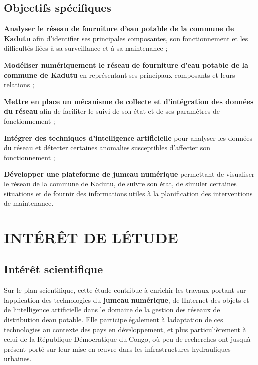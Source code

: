 \subsection{Objectifs spécifiques}
\label{objectifs-specifiques}


\noindent\textbf{Analyser le réseau de fourniture d'eau potable de la
	commune de Kadutu} afin d'identifier ses principales composantes, son
fonctionnement et les difficultés liées à sa surveillance et à sa
maintenance ;

\noindent\textbf{Modéliser numériquement le réseau de fourniture d'eau
	potable de la commune de Kadutu} en représentant ses principaux
composants et leurs relations ;

\noindent\textbf{Mettre en place un mécanisme de collecte et
	d'intégration des données du réseau} afin de faciliter le suivi de son
état et de ses paramètres de fonctionnement ;

\noindent\textbf{Intégrer des techniques d'intelligence artificielle}
pour analyser les données du réseau et détecter certaines anomalies
susceptibles d'affecter son fonctionnement ;

\noindent\textbf{Développer une plateforme de jumeau numérique}
permettant de visualiser le réseau de la commune de Kadutu, de suivre
son état, de simuler certaines situations et de fournir des
informations utiles à la planification des interventions de
maintenance.

\section{INTÉRÊT DE
L\textquotesingle ÉTUDE}\label{intuxe9ruxeat-de-luxe9tude}

\subsection{Intérêt
scientifique}\label{intuxe9ruxeat-scientifique}

Sur le plan scientifique, cette étude contribue à enrichir les travaux
portant sur l\textquotesingle application des technologies du
\textbf{jumeau numérique}, de l\textquotesingle Internet des objets et
de l\textquotesingle intelligence artificielle dans le domaine de la
gestion des réseaux de distribution d\textquotesingle eau potable. Elle
participe également à l\textquotesingle adaptation de ces technologies
au contexte des pays en développement, et plus particulièrement à celui
de la République Démocratique du Congo, où peu de recherches ont
jusqu\textquotesingle à présent porté sur leur mise en œuvre dans les
infrastructures hydrauliques urbaines.

